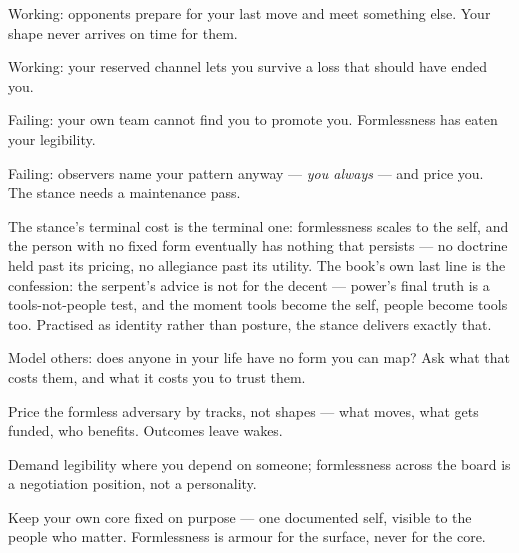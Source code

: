 \begin{feedback}
  \item Working: opponents prepare for your last move and meet something else. Your shape never arrives on time for them.
  \item Working: your reserved channel lets you survive a loss that should have ended you.
  \item Failing: your own team cannot find you to promote you. Formlessness has eaten your legibility.
  \item Failing: observers name your pattern anyway --- \emph{you always} --- and price you. The stance needs a maintenance pass.
\end{feedback}
\begin{failure}
The stance's terminal cost is the terminal one: formlessness scales to the self, and the person with no fixed form eventually has nothing that persists --- no doctrine held past its pricing, no allegiance past its utility. The book's own last line is the confession: the serpent's advice is not for the decent --- power's final truth is a tools-not-people test, and the moment tools become the self, people become tools too. Practised as identity rather than posture, the stance delivers exactly that.
\end{failure}
\begin{countermeasures}
  \item Model others: does anyone in your life have no form you can map? Ask what that costs them, and what it costs you to trust them.
  \item Price the formless adversary by tracks, not shapes --- what moves, what gets funded, who benefits. Outcomes leave wakes.
  \item Demand legibility where you depend on someone; formlessness across the board is a negotiation position, not a personality.
  \item Keep your own core fixed on purpose --- one documented self, visible to the people who matter. Formlessness is armour for the surface, never for the core.
\end{countermeasures}

\seesources
{}
